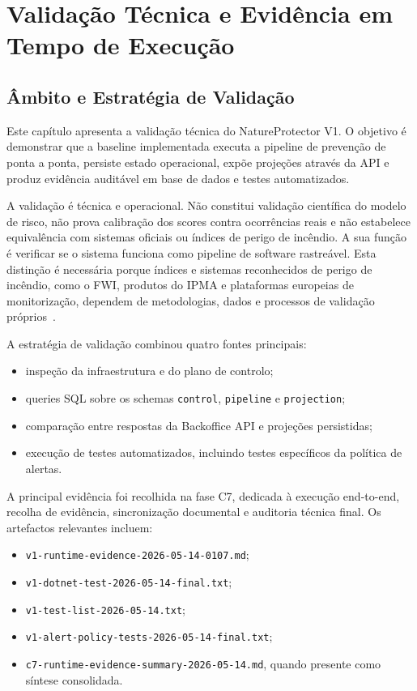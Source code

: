 \chapter{Validação Técnica e Evidência em Tempo de Execução}

\section{Âmbito e Estratégia de Validação}

Este capítulo apresenta a validação técnica do NatureProtector V1. O objetivo é demonstrar que a baseline implementada executa a pipeline de prevenção de ponta a ponta, persiste estado operacional, expõe projeções através da API e produz evidência auditável em base de dados e testes automatizados.

A validação é técnica e operacional. Não constitui validação científica do modelo de risco, não prova calibração dos scores contra ocorrências reais e não estabelece equivalência com sistemas oficiais ou índices de perigo de incêndio. A sua função é verificar se o sistema funciona como pipeline de software rastreável. Esta distinção é necessária porque índices e sistemas reconhecidos de perigo de incêndio, como o FWI, produtos do IPMA e plataformas europeias de monitorização, dependem de metodologias, dados e processos de validação próprios~\citep{nrcan_fwi_system,ipma_fwi,ipma_pir_rcm,ec_jrc_effis}.

A estratégia de validação combinou quatro fontes principais:

\begin{itemize}
    \item inspeção da infraestrutura e do plano de controlo;
    \item queries SQL sobre os schemas \texttt{control}, \texttt{pipeline} e \texttt{projection};
    \item comparação entre respostas da Backoffice API e projeções persistidas;
    \item execução de testes automatizados, incluindo testes específicos da política de alertas.
\end{itemize}

A principal evidência foi recolhida na fase C7, dedicada à execução end-to-end, recolha de evidência, sincronização documental e auditoria técnica final. Os artefactos relevantes incluem:

\begin{itemize}
    \item \texttt{v1-runtime-evidence-2026-05-14-0107.md};
    \item \texttt{v1-dotnet-test-2026-05-14-final.txt};
    \item \texttt{v1-test-list-2026-05-14.txt};
    \item \texttt{v1-alert-policy-tests-2026-05-14-final.txt};
    \item \texttt{c7-runtime-evidence-summary-2026-05-14.md}, quando presente como síntese consolidada.
\end{itemize}

